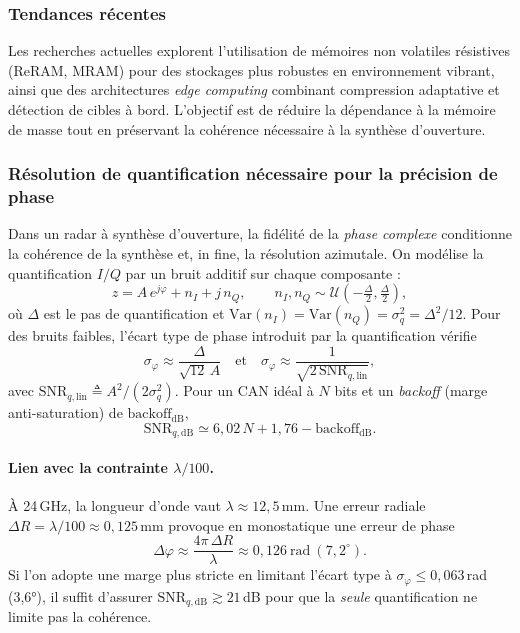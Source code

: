 \subsubsection{Tendances récentes}

Les recherches actuelles explorent l’utilisation de mémoires non volatiles résistives (ReRAM, MRAM) pour des stockages plus robustes en environnement vibrant, ainsi que des architectures \textit{edge computing} combinant compression adaptative et détection de cibles à bord. L’objectif est de réduire la dépendance à la mémoire de masse tout en préservant la cohérence nécessaire à la synthèse d’ouverture.

\subsubsection{Résolution de quantification nécessaire pour la précision de phase}

Dans un radar à synthèse d’ouverture, la fidélité de la \emph{phase complexe} conditionne la cohérence de la synthèse et, in fine, la résolution azimutale.
On modélise la quantification $I/Q$ par un bruit additif sur chaque composante :
\[
z = A\,e^{j\varphi} + n_I + j\,n_Q,\qquad n_I,n_Q \sim \mathcal{U}\!\left(-\tfrac{\Delta}{2},\tfrac{\Delta}{2}\right),
\]
où $\Delta$ est le pas de quantification et $\mathrm{Var}(n_I)=\mathrm{Var}(n_Q)=\sigma_q^2=\Delta^2/12$.
Pour des bruits faibles, l’écart type de phase introduit par la quantification vérifie
\[
\sigma_\varphi \approx \frac{\Delta}{\sqrt{12}\,A}
\quad\text{et}\quad
\sigma_\varphi \approx \frac{1}{\sqrt{2\,\mathrm{SNR}_{q,\mathrm{lin}}}},
\]
avec $\mathrm{SNR}_{q,\mathrm{lin}} \triangleq A^2/(2\sigma_q^2)$. Pour un CAN idéal à $N$ bits et un \emph{backoff} (marge anti-saturation) de $\mathrm{backoff}_{\mathrm{dB}}$,
\[
\mathrm{SNR}_{q,\mathrm{dB}} \simeq 6{,}02\,N + 1{,}76 - \mathrm{backoff}_{\mathrm{dB}}.
\]

\paragraph{Lien avec la contrainte \texorpdfstring{$\lambda/100$}{lambda/100}.}
À 24\,GHz, la longueur d’onde vaut $\lambda \approx 12{,}5$\,mm. Une erreur radiale $\Delta R=\lambda/100 \approx 0{,}125$\,mm provoque en monostatique une erreur de phase
\[
\Delta\varphi \approx \frac{4\pi\,\Delta R}{\lambda} \approx 0{,}126~\text{rad}~(7{,}2^\circ).
\]
Si l’on adopte une marge plus stricte en limitant l’écart type à $\sigma_\varphi \le 0{,}063$\,rad (3,6°), il suffit d’assurer $\mathrm{SNR}_{q,\mathrm{dB}}\gtrsim 21$\,dB pour que la \emph{seule} quantification ne limite pas la cohérence.

